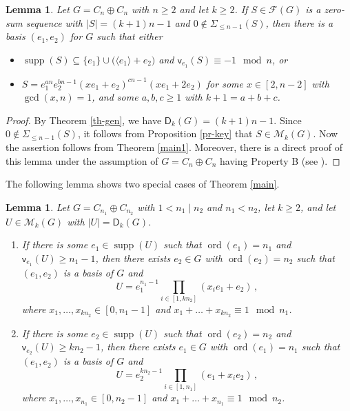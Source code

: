 \documentclass[11pt]{amsart}
\newtheorem{lemma}[theorem]{Lemma}
\theoremstyle{definition}
\DeclareMathOperator{\ord}{ord}
\DeclareMathOperator{\supp}{supp}
\newcommand{\la}{\langle}
\newcommand{\ra}{\rangle}
\newcommand{\vp}{\mathsf v}
\numberwithin{equation}{section}
\begin{document}
\begin{lemma}\label{le-key}  Let $G=C_n\oplus C_n$ with $n\ge 2$ and let $k\ge 2$. If  $S\in\mathcal F(G)$  is a zero-sum sequence with $|S|=(k+1)n-1$ and $0\notin \Sigma_{\leq n-1}(S)$, then  there is a basis $(e_1,e_2)$ for $G$ such that either
	\begin{itemize}
		\item[1.] $\supp(S)\subseteq \{e_1\}\cup \big(\la e_1\ra+e_2\big)$ and $\vp_{e_1}(S)\equiv -1\mod n$, or
		\item[2.] $S=e_1^{an} e_2^{bn-1} (xe_1+e_2)^{cn-1}  (xe_1+2e_2)$ for some $x\in [2,n-2]$ with $\gcd(x,n)=1$, and some  $a,b,c\geq 1$ with $k+1=a+b+c$.
	\end{itemize}
\end{lemma}


\begin{proof}
	By Theorem \ref{th-gen}, we have $\mathsf D_k(G)=(k+1)n-1$.
	Since $0\notin \Sigma_{\leq n-1}(S)$, it follows from 
	 Proposition \ref{pr-key} that $S\in \mathcal M_k(G)$. Now the assertion follows from Theorem \ref{main1}. Moreover, there is a direct proof of this lemma under the assumption of $G=C_n\oplus C_n$ having Property B (see \cite[Lemma 3.2]{Gr21}).
\end{proof}




The following lemma shows two special cases of Theorem \ref{main}.

\begin{lemma}\label{sch-I}
	Let  $G = C_{n_1} \oplus C_{n_2}$  with $1 < n_1 \mid n_2$ and $n_1<n_2$, let $k\ge 2$, and let  $U \in \mathcal M_k(G)$ with  $|U|=\mathsf D_k (G)$. 
	\begin{enumerate}
		\item[1.] If there is some $e_1\in \supp(U)$ such that $\ord(e_1)=n_1$ and $\vp_{e_1}(U)\geq n_1-1$, then 
		there exists $e_2\in G$ with  $\ord(e_2)=n_2$ such that  $(e_1,e_2)$ is a basis of $G$ and
		\[U = e_1^{n_1-1}  \prod_{i\in [1,kn_2]} (x_{i}e_1+e_2)\,,
		\]
		where $x_1, \ldots, x_{kn_2}  \in [0, n_1-1]$ and $x_1 + \ldots + x_{kn_2} \equiv 1 \mod n_1$.
		
		\item[2.] If there is some $e_2\in \supp(U)$ such that  $\ord(e_2)=n_2$ and $\vp_{e_2}(U)\geq kn_2-1$, then 
		there exists $e_1\in G$ with $\ord(e_1)=n_1$  such that $(e_1,e_2)$ is a basis of $G$ and
		\[U = e_2^{kn_2-1}  \prod_{i\in [1,n_1]} (e_1+x_{i}e_2)\,,
		\]
		where $x_1, \ldots, x_{n_1}  \in [0, n_2-1]$ and $x_1 + \ldots + x_{n_1} \equiv 1 \mod n_2$.
	\end{enumerate}
\end{lemma}
\end{document}
